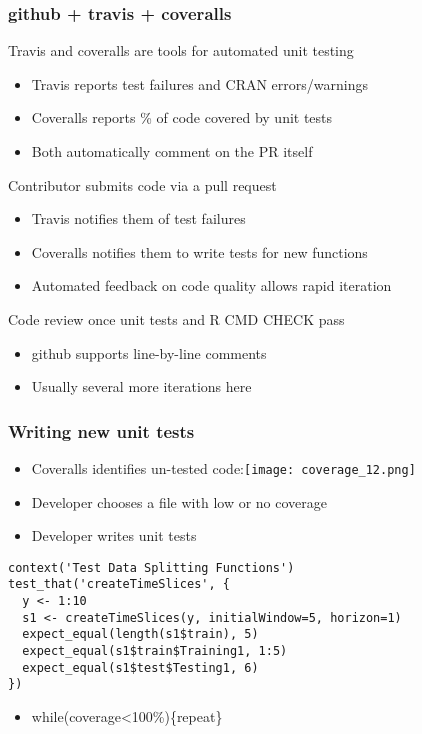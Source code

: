 \documentclass[12 pt]{beamer}\usepackage[]{graphicx}\usepackage[]{color}
\begin{document}
  \begin{frame}[fragile]
\frametitle{github + travis + coveralls}

Travis and coveralls are tools for automated unit testing
\begin{itemize}
\item Travis reports test failures and CRAN errors/warnings
\item Coveralls reports \% of code covered by unit tests
\item Both automatically comment on the PR itself
\end{itemize}

\vspace{.1in}

Contributor submits code via a pull request

\begin{itemize}
\item Travis notifies them of test failures
\item Coveralls notifies them to write tests for new functions
\item Automated feedback on code quality allows rapid iteration
\end{itemize}

\vspace{.1in}

Code review once unit tests and R CMD CHECK pass
\begin{itemize}
\item github supports line-by-line comments
\item Usually several more iterations here
\end{itemize}

\end{frame}


\begin{frame}[fragile]
\frametitle{Writing new unit tests}

\begin{itemize}
\item Coveralls identifies un-tested code:\texttt{[image: coverage\_12.png]}
\item Developer chooses a file with low or no coverage
\item Developer writes unit tests
\end{itemize}
\begin{Verbatim}[fontsize=\footnotesize]
context('Test Data Splitting Functions')
test_that('createTimeSlices', {
  y <- 1:10
  s1 <- createTimeSlices(y, initialWindow=5, horizon=1)
  expect_equal(length(s1$train), 5)
  expect_equal(s1$train$Training1, 1:5)
  expect_equal(s1$test$Testing1, 6)
})
\end{Verbatim}
\begin{itemize}
\item while(coverage\textless 100\%)\{repeat\}
\end{itemize}
\end{frame}
\end{document}

